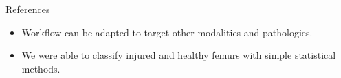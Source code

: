 \documentclass[10pt,aspectratio=169]{beamer}
\begin{document}
\begin{frame}[allowframebreaks]{References}

  
  

  \begin{itemize} \itemsep1.0em
    \item Workflow can be adapted to target other modalities and pathologies.
    \item We were able to classify injured and healthy femurs with simple statistical methods.
  \end{itemize}
\end{frame}
\end{document}
